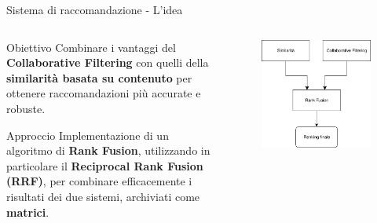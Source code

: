 \documentclass{beamer}
\begin{document}
	\begin{frame}{Sistema di raccomandazione - L'idea}
		\begin{columns}
			\begin{column}{0.6\textwidth}
				\begin{alertblock}{Obiettivo}
					Combinare i vantaggi del \textbf{Collaborative Filtering} con quelli della \textbf{similarità basata su contenuto} per ottenere raccomandazioni più accurate e robuste.
				\end{alertblock}

				\begin{exampleblock}{Approccio}
					Implementazione di un algoritmo di \textbf{Rank Fusion}, utilizzando in particolare il \textbf{Reciprocal Rank Fusion (RRF)}, per combinare efficacemente i risultati dei due sistemi, archiviati come \textbf{matrici}.
				\end{exampleblock}
			\end{column}
			\begin{column}{0.4\textwidth}
				\begin{figure}
					\centering
					\includegraphics[width=\textwidth]{Diagramma pipeline sistema di raccomandazione.png}
				\end{figure}
			\end{column}
		\end{columns}
	\end{frame}
\end{document}
